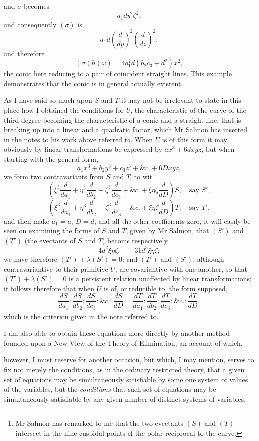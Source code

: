 \documentclass[11pt]{article}
\newcommand{\sourcepage}[1]{\marginpar{\scriptsize p.~#1}}
\begin{document}
\sourcepage{333}
and $\sigma$ becomes
\[
a_1d\eta^2\zeta^2,
\]
and consequently $(\sigma)$ is
\[
a_1d\left(\frac{d}{dy}\right)^2\left(\frac{d}{dz}\right)^2;
\]
and therefore
\[
(\sigma)h(\omega)=4a_1^2d(b_2c_3+d^2)x^2,
\]
the conic here reducing to a pair of coincident straight lines. This example demonstrates that the conic is in general actually existent.

As I have said so much upon $S$ and $T$ it may not be irrelevant to state in this place how I obtained the conditions for $U$, the characteristic of the curve of the third degree becoming the characteristic of a conic and a straight line, that is breaking up into a linear and a quadratic factor, which Mr Salmon has inserted in the notes to his work above referred to. When $U$ is of this form it may obviously by linear transformations be expressed by $ax^3+6dxyz$, but when starting with the general form,
\[
a_1x^3+b_2y^3+c_3z^3+\&c.+6Dxyz,
\]
we form two contravariants from $S$ and $T$, to wit
\[
\left(\xi^3\frac{d}{da_1}+\eta^3\frac{d}{db_2}
+\zeta^3\frac{d}{dc_3}+\&c.+\xi\eta\zeta\frac{d}{dD}\right)S,\quad\text{say }S',
\]
\[
\left(\xi^3\frac{d}{da_1}+\eta^3\frac{d}{db_2}
+\zeta^3\frac{d}{dc_3}+\&c.+\xi\eta\zeta\frac{d}{dD}\right)T,\quad\text{say }T',
\]
and then make $a_1=a$, $D=d$, and all the other coefficients zero, it will easily be seen on examining the forms of $S$ and $T$, given by Mr Salmon, that $(S')$ and $(T')$ (the evectants of $S$ and $T$) become respectively
\[
4d^2\xi\eta\zeta,\qquad 31d^5\xi\eta\zeta;
\]
we have therefore $(T')+\lambda(S')=0$: and $(T')$ and $(S')$, although contravariantive to their primitive $U$, are covariantive with one another, so that $(T')+\lambda(S')=0$ is a persistent relation unaffected by linear transformations; it follows therefore that when $U$ is of, or reducible to, the form supposed,
\[
\frac{dS}{da_1}:\frac{dS}{db_2}:\frac{dS}{dc_3}:\&c.:\frac{dS}{dD}
=
\frac{dT}{da_1}:\frac{dT}{db_2}:\frac{dT}{dc_3}:\&c.:\frac{dT}{dD},
\]
which is the criterion given in the note referred to.\footnote{Mr Salmon has remarked to me that the two evectants $(S)$ and $(T)$ intersect in the nine cuspidal points of the polar reciprocal to the curve.}

I am also able to obtain these equations more directly by another method founded upon a New View of the Theory of Elimination, an account of which,

\sourcepage{334}
however, I must reserve for another occasion, but which, I may mention, serves to fix not merely the conditions, as in the ordinary restricted theory, that a given set of equations may be simultaneously satisfiable by some one system of values of the variables, but the \emph{conditions} that such set of equations may be simultaneously satisfiable by any given number of distinct systems of variables.
\end{document}
